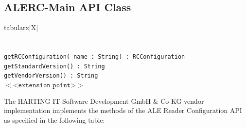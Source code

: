 \documentclass[11pt,a4paper,oneside]{article}
\newenvironment{bbox}%
{\begin{table}[h!]\begin{threeparttable}}%
{\end{threeparttable}\end{table}\FloatBarrier}
\newenvironment{bbox}
{\ifvmode\IgnorePar\fi \EndP\Tg<div class='bbox'>}{\Tg</div>\IgnoreIndent}
\begin{document}
\subsection{ALERC-Main API Class}

\begin{bbox}
\begin{edtable}{tabularx}{\linewidth}{|X|}
\hline 
{}
\\
\\
\texttt{\textendash \textendash \textendash}\\
\texttt{getRCConfiguration( name : String) : RCConfiguration}\\
\texttt{getStandardVersion() : String}\\
\texttt{getVendorVersion() : String}\\
$<$<$\texttt{extension point}$>$>$\\
\hline
\end{edtable}
\end{bbox}

The HARTING IT Software Development GmbH \& Co KG vendor implementation implements the methods of the ALE Reader Configuration API as specified in the following table:
\end{document}
